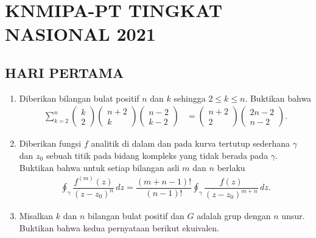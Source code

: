 \documentclass[12pt,twoside]{article}
\begin{document}
\pagebreak

\section{KNMIPA-PT TINGKAT NASIONAL 2021}
\subsection{HARI PERTAMA}
\begin{enumerate}
    \item Diberikan bilangan bulat positif $n$ dan $k$ sehingga $2\leq k\leq n$. Buktikan bahwa
          \begin{align*}
              \sum_{k=2}^n \begin{pmatrix}
                               k \\ 2
                           \end{pmatrix}\begin{pmatrix}
                                            n+2 \\k
                                        \end{pmatrix}
              \begin{pmatrix}
                  n-2 \\k-2
              \end{pmatrix} & = \begin{pmatrix}
                                    n+2 \\2
                                \end{pmatrix}\begin{pmatrix}
                                                 2n-2 \\n-2
                                             \end{pmatrix}.
          \end{align*}
    \item Diberikan fungsi $f$ analitik di dalam dan pada kurva tertutup sederhana $\gamma$ dan $z_0$ sebuah titik pada bidang kompleks yang tidak berada pada $\gamma$. Buktikan bahwa untuk setiap bilangan asli $m$ dan $n$ berlaku
          \begin{align*}
              \oint_{\gamma} \dfrac{f^{(m)}(z)}{(z-z_0)^n}\, dz = \dfrac{(m+n-1)!}{(n-1)!}\oint_{\gamma} \dfrac{f(z)}{(z-z_0)^{m+n}}\, dz.
          \end{align*}
    \item Misalkan $k$ dan $n$ bilangan bulat positif dan $G$ adalah grup dengan $n$ unsur. Buktikan bahwa kedua pernyataan berikut ekuivalen.

\end{enumerate}
\end{document}
